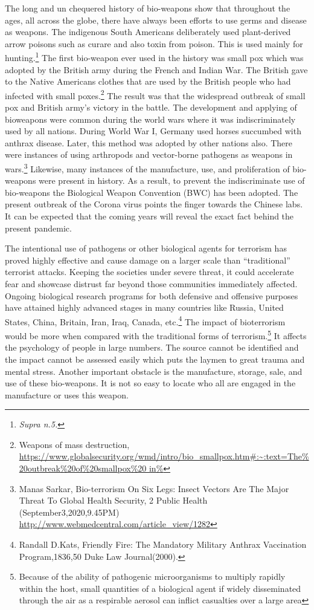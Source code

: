\begin{multicols}{2}
\noi
The long and un chequered history of bio-weapons show that throughout the ages, all across
the globe, there have always been efforts to use germs and disease as weapons. The
indigenous South Americans deliberately used plant-derived arrow poisons such as curare
and also toxin from poison. This is used mainly for hunting.\footnote{\textit{Supra n.5.}} The first bio-weapon ever used
in the history was small pox which was adopted by the British army during the French and
Indian War. The British gave to the Native Americans clothes that are used by the British
people who had infected with small poxes.\footnote{Weapons of mass destruction,
\url{https://www.globalsecurity.org/wmd/intro/bio_smallpox.htm\#:~:text=The\%20outbreak\%20of\%20smallpox\%20 in\%}} The result was that the widespread outbreak of
small pox and British army’s victory in the battle. The development and applying of bioweapons were common during the world wars where it was indiscriminately used by all
nations. During World War I, Germany used horses succumbed with anthrax disease. Later,
this method was adopted by other nations also. There were instances of using arthropods and 
vector-borne pathogens as weapons in wars.\footnote{Manas Sarkar, Bio-terrorism On Six Legs: Insect Vectors Are The Major Threat To Global Health Security, 2 Public Health (September3,2020,9.45PM) \url{http://www.webmedcentral.com/article_view/1282}} Likewise, many instances of the manufacture,
use, and proliferation of bio-weapons were present in history. As a result, to prevent the
indiscriminate use of bio-weapons the Biological Weapon Convention (BWC) has been
adopted. The present outbreak of the Corona virus points the finger towards the Chinese labs.
It can be expected that the coming years will reveal the exact fact behind the present
pandemic.


\noi
The intentional use of pathogens or other biological agents for terrorism has proved highly
effective and cause damage on a larger scale than “traditional” terrorist attacks. Keeping the
societies under severe threat, it could accelerate fear and showcase distrust far beyond those
communities immediately affected. Ongoing biological research programs for both defensive
and offensive purposes have attained highly advanced stages in many countries like Russia,
United States, China, Britain, Iran, Iraq, Canada, etc.\footnote{Randall D.Kats, Friendly Fire: The Mandatory Military Anthrax Vaccination Program,1836,50 Duke Law
Journal(2000).} The impact of bioterrorism would be
more when compared with the traditional forms of terrorism.\footnote{Because of the ability of pathogenic microorganisms to multiply rapidly within the host, small quantities of a biological agent if widely disseminated through the air as a respirable aerosol can inflict casualties over a large
area}  It affects the psychology of
people in large numbers. The source cannot be identified and the impact cannot be assessed
easily which puts the laymen to great trauma and mental stress. Another important obstacle is
the manufacture, storage, sale, and use of these bio-weapons. It is not so easy to locate who
all are engaged in the manufacture or uses this weapon.


\end{multicols}
